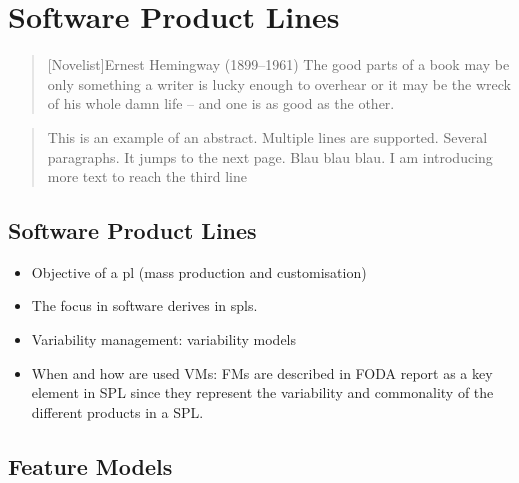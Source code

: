 \chapter{Software Product Lines}

\begin{quotation}[Novelist]{Ernest Hemingway (1899--1961)}
The good parts of a book may be only something a writer is lucky enough to overhear or it may be the wreck of his whole damn life -- and one is as good as the other.
\end{quotation}

\begin{abstract}
This is an example of an abstract. Multiple lines are supported. Several paragraphs. It jumps to the next page. Blau blau blau. I am  introducing more text to reach the third line 
\end{abstract}



\section{Software Product Lines}

\begin{itemize}
\item Objective of a \Gls{pl} (mass production and customisation) \cite{benavides05-CAISE}
\item The focus in software derives in \Glspl{spl}.
\item Variability management: variability models
\item When and how are used VMs: FMs are described in FODA report as a key element in SPL since they represent the variability and commonality of the different products in a SPL.
\end{itemize}

\section{Feature Models}

